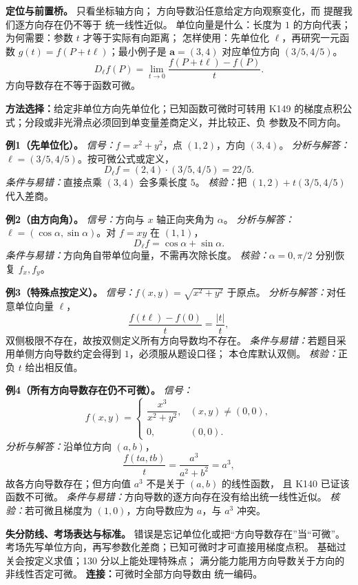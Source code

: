 
\begin{knowledgeBox}
\textbf{定位与前置桥。}
只看坐标轴方向；
方向导数沿任意给定方向观察变化，而
提醒我们逐方向存在仍不等于
统一线性近似。
单位向量是什么：长度为 \(1\) 的方向代表；为何需要：参数 \(t\) 才等于实际有向距离；
怎样使用：先单位化 \(\boldsymbol\ell\)，再研究一元函数
\(g(t)=f(P+t\boldsymbol\ell)\)；最小例子是
\(\boldsymbol a=(3,4)\) 对应单位方向 \((3/5,4/5)\)。
\[
D_{\boldsymbol\ell}f(P)
=\lim_{t\to0}\frac{f(P+t\boldsymbol\ell)-f(P)}t.
\]
方向导数存在不等于函数可微。

\textbf{方法选择：}给定非单位方向先单位化；已知函数可微时可转用 K149
的梯度点积公式；分段或非光滑点必须回到单变量差商定义，并比较正、负
参数及不同方向。

\textbf{例1（先单位化）。}
\emph{信号：}\(f=x^2+y^2\)，点 \((1,2)\)，方向 \((3,4)\)。
\emph{分析与解答：}\(\boldsymbol\ell=(3/5,4/5)\)。按可微公式或定义，
\[
D_{\boldsymbol\ell}f=(2,4)\cdot(3/5,4/5)=22/5.
\]
\emph{条件与易错：}直接点乘 \((3,4)\) 会多乘长度 \(5\)。
\emph{核验：}把 \((1,2)+t(3/5,4/5)\) 代入差商。

\textbf{例2（由方向角）。}
\emph{信号：}方向与 \(x\) 轴正向夹角为 \(\alpha\)。
\emph{分析与解答：}\(\boldsymbol\ell=(\cos\alpha,\sin\alpha)\)。对
\(f=xy\) 在 \((1,1)\)，
\[
D_{\boldsymbol\ell}f=\cos\alpha+\sin\alpha.
\]
\emph{条件与易错：}方向角自带单位向量，不需再次除长度。
\emph{核验：}\(\alpha=0,\pi/2\) 分别恢复 \(f_x,f_y\)。

\textbf{例3（特殊点按定义）。}
\emph{信号：}\(f(x,y)=\sqrt{x^2+y^2}\) 于原点。
\emph{分析与解答：}对任意单位向量 \(\boldsymbol\ell\)，
\[
\frac{f(t\boldsymbol\ell)-f(0)}t=\frac{|t|}{t},
\]
双侧极限不存在，故按双侧定义所有方向导数均不存在。
\emph{条件与易错：}若题目采用单侧方向导数约定会得到 \(1\)，必须服从题设口径；
本仓库默认双侧。
\emph{核验：}正负 \(t\) 给出相反值。

\textbf{例4（所有方向导数存在仍不可微）。}
\emph{信号：}
\[
f(x,y)=
\begin{cases}\dfrac{x^3}{x^2+y^2},&(x,y)\ne(0,0),\\0,&(0,0).\end{cases}
\]
\emph{分析与解答：}沿单位方向 \((a,b)\)，
\[
\frac{f(ta,tb)}t=\frac{a^3}{a^2+b^2}=a^3,
\]
故各方向导数存在；但方向值 \(a^3\) 不是关于 \((a,b)\) 的线性函数，
且 K140 已证该函数不可微。
\emph{条件与易错：}方向导数的逐方向存在没有给出统一线性近似。
\emph{核验：}若可微且梯度为 \((1,0)\)，方向导数应为 \(a\)，与 \(a^3\) 冲突。

\textbf{失分防线、考场表达与标准。}
错误是忘记单位化或把“方向导数存在”当“可微”。
考场先写单位方向，再写参数化差商；已知可微时才可直接用梯度点积。
基础过关会按定义求值；130 分以上能处理特殊点；
满分能力能用方向导数关于方向的非线性否定可微。
\textbf{连接：}可微时全部方向导数由
统一编码。
\end{knowledgeBox}


